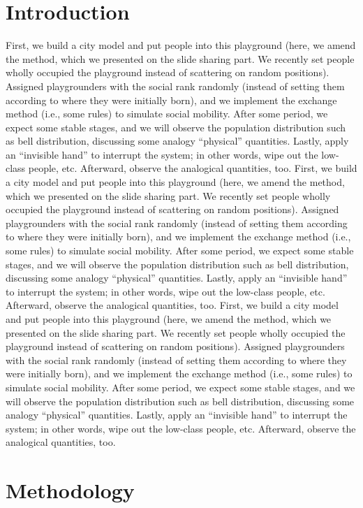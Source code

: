 \documentclass[12pt]{article}
\begin{document}
\begin{multicols}{2}
\section{Introduction}
    First, we build a city model and put people into this playground (here, we amend the method, which we presented on the slide sharing part. We recently set people wholly occupied the playground instead of scattering on random positions). Assigned playgrounders with the social rank randomly (instead of setting them according to where they were initially born), and we implement the exchange method (i.e., some rules) to simulate social mobility. After some period, we expect some stable stages, and we will observe the population distribution such as bell distribution, discussing some analogy “physical” quantities. Lastly, apply an “invisible hand” to interrupt the system; in other words, wipe out the low-class people, etc. Afterward, observe the analogical quantities, too.
    First, we build a city model and put people into this playground (here, we amend the method, which we presented on the slide sharing part. We recently set people wholly occupied the playground instead of scattering on random positions). Assigned playgrounders with the social rank randomly (instead of setting them according to where they were initially born), and we implement the exchange method (i.e., some rules) to simulate social mobility. After some period, we expect some stable stages, and we will observe the population distribution such as bell distribution, discussing some analogy “physical” quantities. Lastly, apply an “invisible hand” to interrupt the system; in other words, wipe out the low-class people, etc. Afterward, observe the analogical quantities, too.
    First, we build a city model and put people into this playground (here, we amend the method, which we presented on the slide sharing part. We recently set people wholly occupied the playground instead of scattering on random positions). Assigned playgrounders with the social rank randomly (instead of setting them according to where they were initially born), and we implement the exchange method (i.e., some rules) to simulate social mobility. After some period, we expect some stable stages, and we will observe the population distribution such as bell distribution, discussing some analogy “physical” quantities. Lastly, apply an “invisible hand” to interrupt the system; in other words, wipe out the low-class people, etc. Afterward, observe the analogical quantities, too.

\section{Methodology}

\end{multicols}
\end{document}
